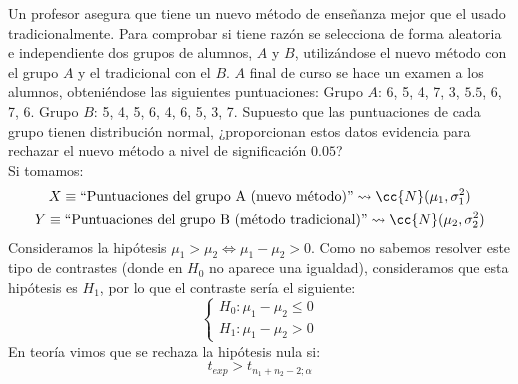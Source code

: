 \begin{ejercicio}
    Un profesor asegura que tiene un nuevo método de enseñanza mejor que el usado tradicionalmente. Para comprobar si tiene razón se selecciona de forma aleatoria e independiente dos grupos de alumnos, $A$ y $B$, utilizándose el nuevo método con el grupo $A$ y el tradicional con el $B$. $A$ final de curso se hace un examen a los alumnos, obteniéndose las siguientes puntuaciones:\newline
    Grupo $A$: 6, 5, 4, 7, 3, $5.5$, 6, 7, 6.\newline
    Grupo $B$: 5, 4, 5, 6, 4, 6, 5, 3, 7.\newline
    Supuesto que las puntuaciones de cada grupo tienen distribución normal, ¿proporcionan estos datos evidencia para rechazar el nuevo método a nivel de significación $0.05$?\\

    \noindent
    Si tomamos:
    \begin{gather*}
        X\equiv \text{``Puntuaciones del grupo A (nuevo método)''} \rightsquigarrow\cc{N}(\mu_1,\sigma_1^2) \\
        Y\equiv \text{``Puntuaciones del grupo B (método tradicional)''} \rightsquigarrow\cc{N}(\mu_2,\sigma_2^2) 
    \end{gather*}
    Consideramos la hipótesis $\mu_1>\mu_2 \Longleftrightarrow \mu_1-\mu_2>0$. Como no sabemos resolver este tipo de contrastes (donde en $H_0$ no aparece una igualdad), consideramos que esta hipótesis es $H_1$, por lo que el contraste sería el siguiente:
    \begin{equation*}
        \left\{\begin{array}{l}
            H_0 : \mu_1-\mu_2\leq 0 \\
            H_1 : \mu_1-\mu_2> 0
        \end{array}\right.
    \end{equation*} %
    En teoría vimos que se rechaza la hipótesis nula si:
    \begin{equation*}
        t_{exp} >t_{n_1+n_2-2;\alpha}
    \end{equation*}


\end{ejercicio}
